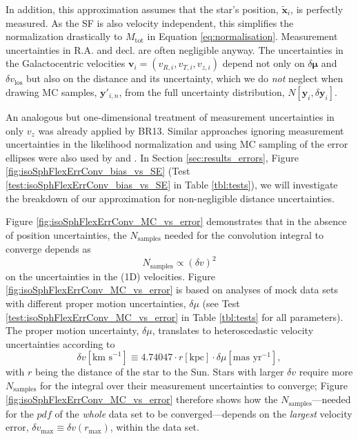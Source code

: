 \documentclass[iop,revtex4,numberedappendix,appendixfloats]{emulateapj}
\newcommand{\vect}[1]{\boldsymbol{#1}}
\newcommand{\pdf}{\ensuremath{pdf}}
\begin{document}
In addition, this approximation assumes that the star's position, $\tilde{\vect{x}}_i$, is perfectly measured. As the SF is also velocity independent, this simplifies the normalization drastically to $M_\text{tot}$ in Equation \eqref{eq:normalisation}. Measurement uncertainties in $\mathrm{R.A.}$ and $\mathrm{decl.}$ are often negligible anyway. The uncertainties in the Galactocentric velocities $\vect{v}_i = (v_{R,i},v_{T,i},v_{z,i})$ depend not only on $\delta \vect{\mu}$ and $\delta v_\text{los}$ but also on the distance and its uncertainty, which we do \emph{not} neglect when drawing MC samples, $\vect{y}'_{i,n}$, from the full uncertainty distribution, $N[\vect{y}_i,\delta \vect{y}_i]$. 

An analogous but one-dimensional treatment of measurement uncertainties in only $v_z$ was already applied by BR13. Similar approaches ignoring measurement uncertainties in the likelihood normalization and using MC sampling of the error ellipses were also used by \citet{2013MNRAS.433.1411M} and \citet{2016MNRAS.tmp..817D}. In Section \ref{sec:results_errors}, Figure \ref{fig:isoSphFlexErrConv_bias_vs_SE} (Test \ref{test:isoSphFlexErrConv_bias_vs_SE} in Table \ref{tbl:tests}), we will investigate the breakdown of our approximation for non-negligible distance uncertainties.

Figure \ref{fig:isoSphFlexErrConv_MC_vs_error} demonstrates that in the absence of position uncertainties, the $N_\text{samples}$ needed for the convolution integral to converge depends as
\begin{equation*}
N_\text{samples} \propto \left( \delta v \right)^2
\end{equation*}
on the uncertainties in the (1D) velocities. 
Figure \ref{fig:isoSphFlexErrConv_MC_vs_error} is based on analyses of mock data sets with different proper motion uncertainties, $\delta \mu$ (see Test \ref{test:isoSphFlexErrConv_MC_vs_error} in Table \ref{tbl:tests} for all parameters). The proper motion uncertainty, $\delta \mu$, translates to heteroscedastic velocity uncertainties according to 
\begin{equation*}
\delta v [\text{km s}^{-1}] \equiv 4.74047 \cdot r[\text{kpc}] \cdot \delta \mu [\text{mas yr}^{-1}],
\end{equation*}
with $r$ being the distance of the star to the Sun. Stars with larger $\delta v$ require more $N_\text{samples}$ for the integral over their measurement uncertainties to converge; Figure \ref{fig:isoSphFlexErrConv_MC_vs_error} therefore shows how the $N_\text{samples}$---needed for the \pdf{} of the \emph{whole} data set to be converged---depends on the \emph{largest} velocity error, $\delta v_\text{max} \equiv \delta v(r_\text{max})$, within the data set.
\end{document}
